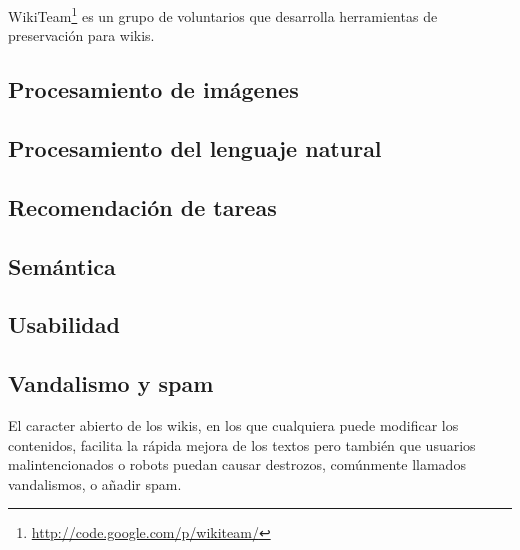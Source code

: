 \documentclass[11pt,onecolumn]{article}
\begin{document}
\citep{popitsch2010}


WikiTeam\footnote{\href{http://code.google.com/p/wikiteam/}{http://code.google.com/p/wikiteam/}} es un grupo de voluntarios que desarrolla herramientas de preservación para wikis.

\subsection{Procesamiento de imágenes}


\subsection{Procesamiento del lenguaje natural}


\subsection{Recomendación de tareas}



\subsection{Semántica}


\subsection{Usabilidad}



% 

\subsection{Vandalismo y spam}


El caracter abierto de los wikis, en los que cualquiera puede modificar los contenidos, facilita la rápida mejora de los textos pero también que usuarios malintencionados o robots puedan causar destrozos, comúnmente llamados vandalismos, o añadir spam.
\end{document}
